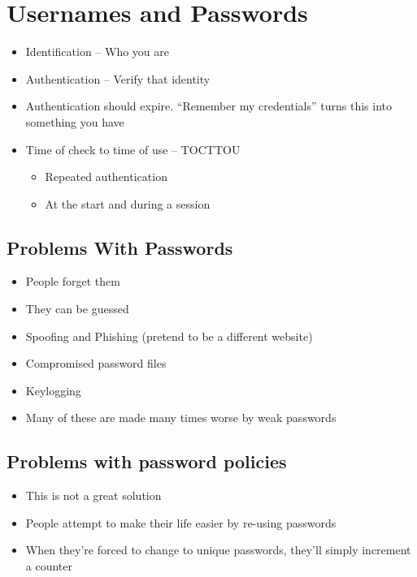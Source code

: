 \documentclass{article}
\begin{document}
\tableofcontents

\newpage

\section{Usernames and Passwords}
\begin{itemize}
  \item Identification – Who you are 
  \item Authentication – Verify that identity 
  \item Authentication should expire. “Remember my credentials” turns this into something you have 
  \item Time of check to time of use – TOCTTOU 
  \begin{itemize}
    \item Repeated authentication 
    \item At the start and during a session
  \end{itemize}
\end{itemize}

\subsection{Problems With Passwords}
\begin{itemize}
  \item People forget them 
  \item They can be guessed
  \item Spoofing and Phishing (pretend to be a different website)
  \item Compromised password files 
  \item Keylogging 
  \item Many of these are made many times worse by weak passwords
\end{itemize}

\subsection{Problems with password policies}
\begin{itemize}
  \item This is not a great solution 
  \item People attempt to make their life easier by re-using passwords 
  \item When they’re forced to change to unique passwords, they’ll simply increment a counter
\end{itemize}
\end{document}
